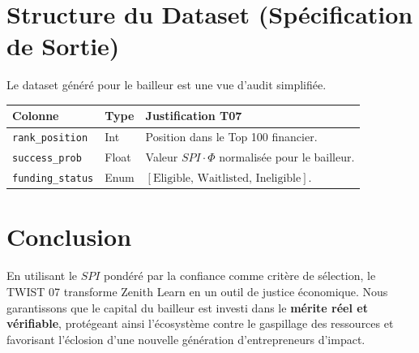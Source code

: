 \documentclass[11pt,a4paper]{article}
\begin{document}
\section{Structure du Dataset (Spécification de Sortie)}
Le dataset généré pour le bailleur est une vue d'audit simplifiée.
\begin{table}[h!]
\centering
\begin{tabular}{|l|l|p{7cm}|}
\hline
\rowcolor{BrandDark} \color{white} Colonne & \color{white} Type & \color{white} Justification T07 \\ \hline
\texttt{rank\_position} & Int & Position dans le Top 100 financier. \\ \hline
\rowcolor{BrandPrimary!20} \texttt{success\_prob} & Float & Valeur $SPI \cdot \Phi$ normalisée pour le bailleur. \\ \hline
\texttt{funding\_status} & Enum & $[\text{Eligible, Waitlisted, Ineligible}]$. \\ \hline
\end{tabular}
\end{table}

\section{Conclusion}
En utilisant le $SPI$ pondéré par la confiance comme critère de sélection, le TWIST 07 transforme Zenith Learn en un outil de justice économique. Nous garantissons que le capital du bailleur est investi dans le \textbf{mérite réel et vérifiable}, protégeant ainsi l'écosystème contre le gaspillage des ressources et favorisant l'éclosion d'une nouvelle génération d'entrepreneurs d'impact.
\end{document}
